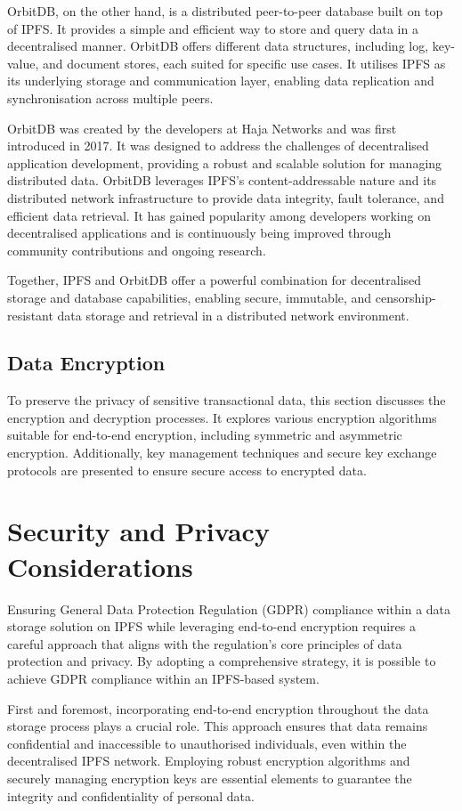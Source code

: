 \documentclass[a4paper,11 pt]{article}
\theoremstyle{definition}
\begin{document}
OrbitDB, on the other hand, is a distributed peer-to-peer database built on top of IPFS. It provides a simple and efficient way to store and query data in a decentralised manner. OrbitDB offers different data structures, including log, key-value, and document stores, each suited for specific use cases. It utilises IPFS as its underlying storage and communication layer, enabling data replication and synchronisation across multiple peers.

OrbitDB was created by the developers at Haja Networks and was first introduced in 2017. It was designed to address the challenges of decentralised application development, providing a robust and scalable solution for managing distributed data. OrbitDB leverages IPFS's content-addressable nature and its distributed network infrastructure to provide data integrity, fault tolerance, and efficient data retrieval. It has gained popularity among developers working on decentralised applications and is continuously being improved through community contributions and ongoing research.

Together, IPFS and OrbitDB offer a powerful combination for decentralised storage and database capabilities, enabling secure, immutable, and censorship-resistant data storage and retrieval in a distributed network environment.

\subsection{Data Encryption}
To preserve the privacy of sensitive transactional data, this section discusses the encryption and decryption processes. It explores various encryption algorithms suitable for end-to-end encryption, including symmetric and asymmetric encryption. Additionally, key management techniques and secure key exchange protocols are presented to ensure secure access to encrypted data.

\section{Security and Privacy Considerations}
Ensuring General Data Protection Regulation (GDPR) compliance within a data storage solution on IPFS while leveraging end-to-end encryption requires a careful approach that aligns with the regulation's core principles of data protection and privacy. By adopting a comprehensive strategy, it is possible to achieve GDPR compliance within an IPFS-based system.

First and foremost, incorporating end-to-end encryption throughout the data storage process plays a crucial role. This approach ensures that data remains confidential and inaccessible to unauthorised individuals, even within the decentralised IPFS network. Employing robust encryption algorithms and securely managing encryption keys are essential elements to guarantee the integrity and confidentiality of personal data.
\end{document}
